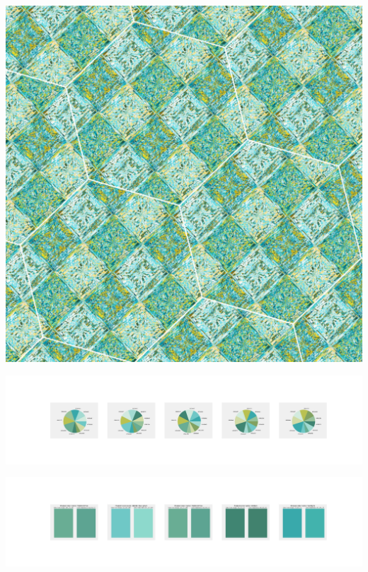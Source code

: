 \documentclass[11pt]{article}
\begin{document}
\begin{landscape}
    \begin{center}
    \includegraphics[width=\textwidth]{./nbimg/file (324).jpg}
    \end{center}

    \begin{center}
    \includegraphics[width=250mm]{./nbimg/pie-250.jpg}
    \end{center}

    \begin{center}
    \includegraphics[width=250mm]{./nbimg/peak-250.jpg}
    \end{center}
    


\end{landscape}
\end{document}
